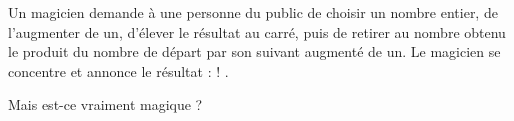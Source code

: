 
\begin{enigme}[Magique ?]

Un magicien demande à une personne du public de choisir un nombre entier, de l'augmenter de un, d'élever le résultat au carré, puis de retirer au nombre obtenu le produit du nombre de départ par son suivant augmenté de un.
\vspace{.5em}
Le magicien se concentre et annonce le résultat :  ! \fg.

\vspace{.5em}

Mais est-ce vraiment magique ?
\end{enigme}
